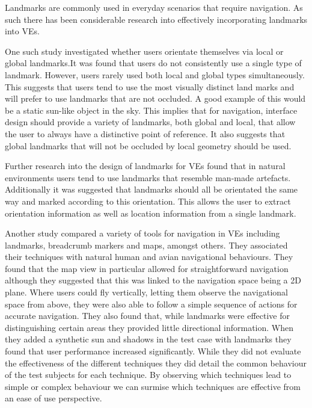 \documentclass{sig-alternate-05-2015}
\begin{document}
Landmarks are commonly used in everyday scenarios that require navigation. As such there has been considerable research into effectively incorporating landmarks into VEs.

One such study investigated whether users orientate themselves via local or global landmarks\cite{Steck2000}.It was found that users do not consistently use a single type of landmark. However, users rarely used both local and global types simultaneously. This suggests that users tend to use the most visually distinct land marks and will prefer to use landmarks that are not occluded. A good example of this would be a static sun-like object in the sky. This implies that for navigation, interface design should provide a variety of landmarks, both global and local, that allow the user to always have a distinctive point of reference. It also suggests that global landmarks that will not be occluded by local geometry should be used. 

Further research into the design of landmarks for VEs found that in natural environments users tend to use landmarks that resemble man-made artefacts\cite{Vinson1999}. Additionally it was suggested that landmarks should all be orientated the same way and marked according to this orientation. This allows the user to extract orientation information as well as location information from a single landmark.

Another study compared a variety of tools for navigation in VEs including landmarks, breadcrumb markers and maps, amongst others\cite{Darken1993}. They associated their techniques with natural human and avian  navigational behaviours. They found that the map view in particular allowed for straightforward navigation although they suggested that this was linked to the navigation space being a 2D plane. Where users could fly vertically, letting them observe the navigational space from above, they were also able to follow a simple sequence of actions for accurate navigation. They also found that, while landmarks were effective for distinguishing certain areas they provided little directional information. When they added a synthetic sun and shadows in the test case with landmarks they found that user performance increased significantly. While they did not evaluate the effectiveness of the different techniques they did detail the common behaviour of the test subjects for each technique. By observing which techniques lead to simple or complex behaviour we can surmise which techniques are effective from an ease of use perspective.
\end{document}
